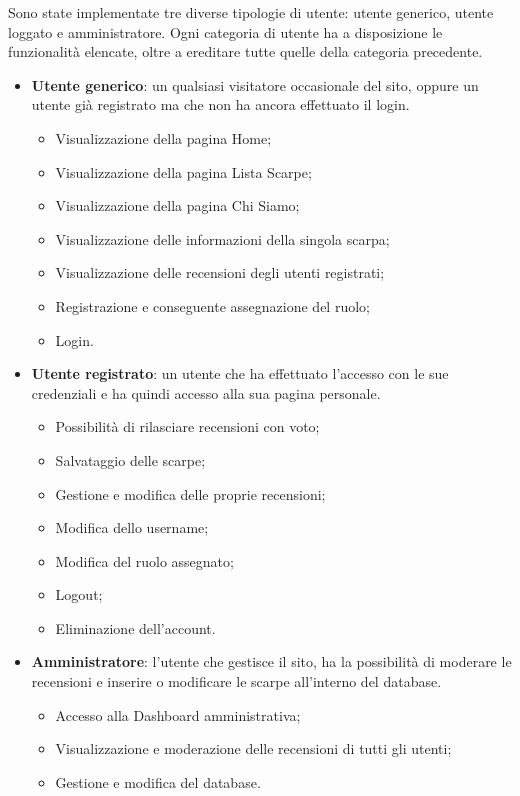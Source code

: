 \documentclass[a4paper, 12pt]{article}
\begin{document}
\begin{justify}
Sono state implementate tre diverse tipologie di utente: utente generico, utente loggato e amministratore. Ogni categoria di utente ha a disposizione le funzionalità elencate, oltre a ereditare tutte quelle della categoria precedente.
\begin{itemize}
    \item \textbf{Utente generico}: un qualsiasi visitatore occasionale del sito, oppure un utente già registrato ma che non ha ancora effettuato il login.
        \begin{itemize}
            \item Visualizzazione della pagina Home;
            \item Visualizzazione della pagina Lista Scarpe;
            \item Visualizzazione della pagina Chi Siamo;
            \item Visualizzazione delle informazioni della singola scarpa;
            \item Visualizzazione delle recensioni degli utenti registrati;
            \item Registrazione e conseguente assegnazione del ruolo;
            \item Login.
        \end{itemize}
    \item \textbf{Utente registrato}: un utente che ha effettuato l'accesso con le sue credenziali e ha quindi accesso alla sua pagina personale.
        \begin{itemize}
            \item Possibilità di rilasciare recensioni con voto;
            \item Salvataggio delle scarpe;
            \item Gestione e modifica delle proprie recensioni;
            \item Modifica dello username;
            \item Modifica del ruolo assegnato;
            \item Logout;
            \item Eliminazione dell'account.
        \end{itemize}
    \item \textbf{Amministratore}: l'utente che gestisce il sito, ha la possibilità di moderare le recensioni e inserire o modificare le scarpe all'interno del database.
        \begin{itemize}
            \item Accesso alla Dashboard amministrativa;
            \item Visualizzazione e moderazione delle recensioni di tutti gli utenti;
            \item Gestione e modifica del database.
        \end{itemize}
\end{itemize}


\end{justify}
\end{document}
